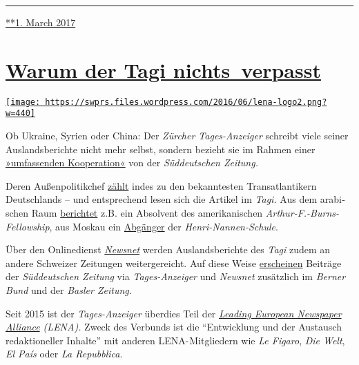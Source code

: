 \begin{center}\rule{0.5\linewidth}{\linethickness}\end{center}

\href{https://swprs.org/2017/03/01/das-gewuenschte-narrativ/}{**1. March
2017}

\hypertarget{warum-der-tagi-nichts-verpasst}{%
\section{\texorpdfstring{\href{https://swprs.org/2017/03/01/warum-der-tagesanzeiger-nichts-verpasst/}{Warum
der Tagi
nichts~verpasst}}{Warum der Tagi nichts~verpasst}}\label{warum-der-tagi-nichts-verpasst}}

\href{https://swprs.org/2017/03/01/warum-der-tagesanzeiger-nichts-verpasst/}{\texttt{[image: https://swprs.files.wordpress.com/2016/06/lena-logo2.png?w=440]}}

Ob Ukraine, Syrien oder Chi­na: Der \emph{Zürcher Tages-Anzeiger}
schreibt viele seiner Aus­lands­berichte nicht mehr selbst, sondern
bezieht sie im Rah­men einer
\href{https://www.tagesanzeiger.ch/schweiz/standard/In-eigener-Sache/story/24648194}{»umfassenden
Ko­ope­ra­tion«} von der \emph{Süd­deut­schen Zeitung.}

Deren Außen­politik­chef
\href{https://swprs.org/netzwerk-medien-deutschland/}{zählt} indes zu
den bekanntesten Trans­at­lan­tikern Deutsch­lands -- und ent­spre­chend
le­sen sich die Arti­kel im \emph{Tagi.} Aus dem ara­bi­schen Raum
\href{https://web.archive.org/web/20170606085220/http://www.icfj.org/sites/default/files/Kr\%C3\%BCger.pdf}{berichtet}
z.B. ein Absol­vent des ameri­ka­ni­schen
\emph{Arthur-F.-Burns-Fellowship}, aus Mos­kau ein
\href{https://spiegelkabinett-blog.blogspot.com/2016/09/julian-hans-von-der-suddeutschen.html}{Ab­gänger}
der \emph{Henri-Nannen-Schule}.

Über den Onlinedienst
\emph{\href{https://de.wikipedia.org/wiki/Newsnet}{Newsnet}} werden
Aus­lands­be­rich­te des \emph{Tagi} zudem an andere Schwei­zer
Zei­tungen wei­ter­ge­reicht. Auf diese Weise
\href{http://www.tagesanzeiger.ch/ausland/europa/Den-Ausloeser-zum-Krieg-habe-ich-gedrueckt/story/16330278}{er­scheinen}
Beiträge der \emph{Süd­deutschen Zeitung} via \emph{Tages­-Anzeiger} und
\emph{Newsnet} zu­sätz­lich im \emph{Berner Bund} und der \emph{Basler
Zeitung.}

Seit 2015 ist der \emph{Tages­-Anzeiger} über­dies Teil der
\emph{\href{https://de.wikipedia.org/wiki/Leading_European_Newspaper_Alliance}{Leading
European News­paper Alliance} (LENA).} Zweck des Ver­bunds ist die
``Ent­wick­lung und der Aus­tausch re­dak­tio­neller In­hal­te'' mit
anderen LENA- Mit­glie­dern wie \emph{Le Fi­g­aro}, \emph{Die Welt},
\emph{El País} oder \emph{La Re­pub­blica}.


